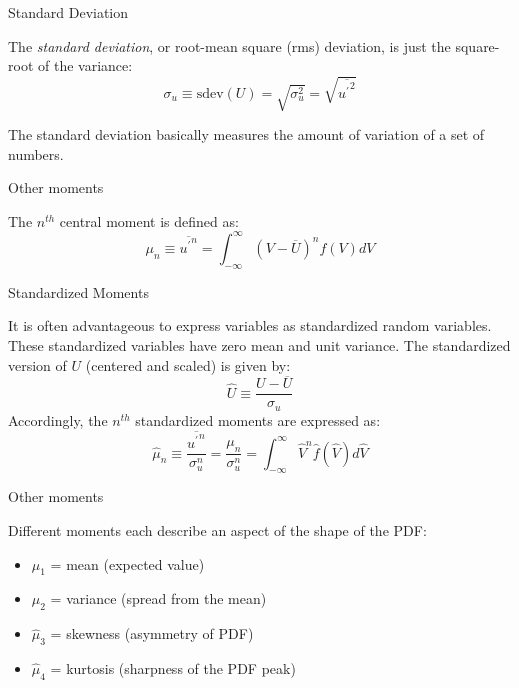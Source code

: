 
\begin{frame}{Standard Deviation}

The \textit{standard deviation}, or root-mean square (rms) deviation, is just the square-root of the variance:
$$\sigma_u \equiv \text{sdev}(U) = \sqrt{\sigma_u^2} = \sqrt{\overline{{u^\prime}^2}}$$

The standard deviation basically measures the amount of variation of a set of numbers.
\end{frame}


\begin{frame}{Other moments}

The $n^{th}$ central moment is defined as:
$$\mu_n \equiv \overline{{u^\prime}^n} = \int^{\infty}_{-\infty} (V - \overline{U})^n f(V)dV$$
\end{frame}


\begin{frame}{Standardized Moments}

It is often advantageous to express variables as standardized random variables. These standardized variables have zero mean and unit variance.\newline\newline
The standardized version of $U$ (centered and scaled) is given by:
$$\hat U \equiv \frac{U - \overline{U}}{\sigma_u}$$
Accordingly, the $n^{th}$ standardized moments are expressed as:
$$\hat \mu_n \equiv \frac{\overline{{u^\prime}^n}}{\sigma_u^n} = \frac{\mu_n}{\sigma_u^n}  = \int^{\infty}_{-\infty} \hat V^n \hat f(\hat V)d \hat V$$

\end{frame}


\begin{frame}{Other moments}

Different moments each describe an aspect of the shape of the PDF:
\begin{itemize}
	\item $\mu_1$      = mean (expected value)
	\item $\mu_2$      = variance (spread from the mean)
	\item $\hat \mu_3$ = skewness (asymmetry of PDF)
	\item $\hat \mu_4$ = kurtosis (sharpness of the PDF peak)
\end{itemize}

\end{frame}

